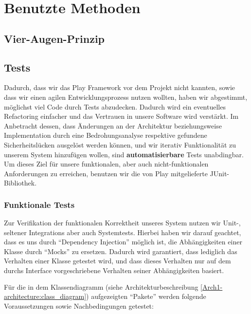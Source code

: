 \documentclass[12pt,DIV14,BCOR10mm,a4paper,twoside,parskip=half-,headsepline,headinclude,english,ngerman,bibliography=totocnumbered]{scrreprt}
\begin{document}
\tableofcontents  %

\chapter{Benutzte Methoden}
\section{Vier-Augen-Prinzip}
\section{Tests}

Dadurch, dass wir das Play Framework vor dem Projekt nicht kannten, sowie dass wir einen agilen Entwicklungsprozess nutzen wollten, haben wir abgestimmt, möglichst viel Code durch Tests abzudecken.
Dadurch wird ein eventuelles Refactoring einfacher und das Vertrauen in unsere Software wird verstärkt.
Im Anbetracht dessen, dass Änderungen an der Architektur beziehungsweise Implementation durch eine Bedrohungsanalyse respektive gefundene Sicherheitslücken ausgelöst werden können, und wir iterativ Funktionalität zu unserem System hinzufügen wollen, sind \textbf{automatisierbare} Tests unabdingbar.
Um dieses Ziel für unsere funktionalen, aber auch nicht-funktionalen Anforderungen zu erreichen, benutzen wir die von Play mitgelieferte JUnit-Bibliothek.

\subsection{Funktionale Tests}

Zur Verifikation der funktionalen Korrektheit unseres System nutzen wir Unit-, seltener Integrations aber auch Systemtests.
Hierbei haben wir darauf geachtet, dass es uns durch \enquote{Dependency Injection} möglich ist, die Abhängigkeiten einer Klasse durch \enquote{Mocks} zu ersetzen.
Dadurch wird garantiert, dass lediglich das Verhalten einer Klasse getestet wird, und dass dieses Verhalten nur auf dem durchs Interface vorgeschriebene Verhalten seiner Abhängigkeiten basiert.


Für die in dem Klassendiagramm (siehe Architekturbeschreibung \ref{Arch1-architecture:class_diagram}) aufgezeigten \enquote{Pakete} werden folgende Voraussetzungen sowie Nachbedingungen getestet:
\end{document}
